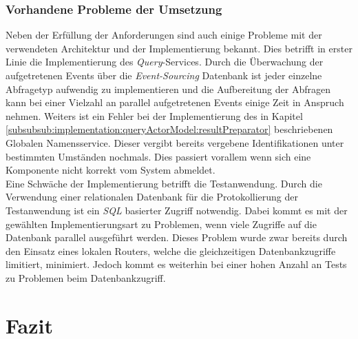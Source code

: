 \subsection{Vorhandene Probleme der Umsetzung}
Neben der Erfüllung der Anforderungen sind auch einige Probleme mit der verwendeten Architektur und der Implementierung bekannt. Dies betrifft in erster Linie die Implementierung des \textit{Query}-Services. Durch die Überwachung der aufgetretenen Events über die \textit{Event-Sourcing} Datenbank ist jeder einzelne Abfragetyp aufwendig zu implementieren und die Aufbereitung der Abfragen kann bei einer Vielzahl an parallel aufgetretenen Events einige Zeit in Anspruch nehmen. Weiters ist ein Fehler bei der Implementierung des in Kapitel \ref{subsubsub:implementation:queryActorModel:resultPreparator} beschriebenen Globalen Namensservice. Dieser vergibt bereits vergebene Identifikationen unter bestimmten Umständen nochmals. Dies passiert vorallem wenn sich eine Komponente nicht korrekt vom System abmeldet. \\
% 
% 
% 
% 
Eine Schwäche der Implementierung betrifft die Testanwendung. Durch die Verwendung einer relationalen Datenbank für die Protokollierung der Testanwendung ist ein \textit{SQL} basierter Zugriff notwendig. Dabei kommt es mit der gewählten Implementierungsart zu Problemen, wenn viele Zugriffe auf die Datenbank parallel ausgeführt werden. Dieses Problem wurde zwar bereits durch den Einsatz eines lokalen Routers, welche die gleichzeitigen Datenbankzugriffe limitiert, minimiert. Jedoch kommt es weiterhin bei einer hohen Anzahl an Tests zu Problemen beim Datenbankzugriff. 
% 
% 

\chapter{Fazit}

